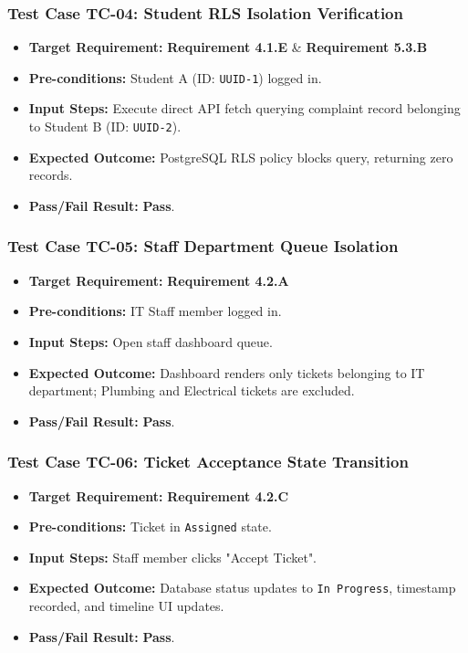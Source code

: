 \documentclass[12pt, a4paper]{article}
\begin{document}
\subsubsection{Test Case TC-04: Student RLS Isolation Verification}
\begin{itemize}[leftmargin=*]
    \item \textbf{Target Requirement:} \textbf{Requirement 4.1.E} \& \textbf{Requirement 5.3.B}
    \item \textbf{Pre-conditions:} Student A (ID: \texttt{UUID-1}) logged in.
    \item \textbf{Input Steps:} Execute direct API fetch querying complaint record belonging to Student B (ID: \texttt{UUID-2}).
    \item \textbf{Expected Outcome:} PostgreSQL RLS policy blocks query, returning zero records.
    \item \textbf{Pass/Fail Result:} \textbf{Pass}.
\end{itemize}

\subsubsection{Test Case TC-05: Staff Department Queue Isolation}
\begin{itemize}[leftmargin=*]
    \item \textbf{Target Requirement:} \textbf{Requirement 4.2.A}
    \item \textbf{Pre-conditions:} IT Staff member logged in.
    \item \textbf{Input Steps:} Open staff dashboard queue.
    \item \textbf{Expected Outcome:} Dashboard renders only tickets belonging to IT department; Plumbing and Electrical tickets are excluded.
    \item \textbf{Pass/Fail Result:} \textbf{Pass}.
\end{itemize}

\subsubsection{Test Case TC-06: Ticket Acceptance State Transition}
\begin{itemize}[leftmargin=*]
    \item \textbf{Target Requirement:} \textbf{Requirement 4.2.C}
    \item \textbf{Pre-conditions:} Ticket in \texttt{Assigned} state.
    \item \textbf{Input Steps:} Staff member clicks "Accept Ticket".
    \item \textbf{Expected Outcome:} Database status updates to \texttt{In Progress}, timestamp recorded, and timeline UI updates.
    \item \textbf{Pass/Fail Result:} \textbf{Pass}.
\end{itemize}
\end{document}
